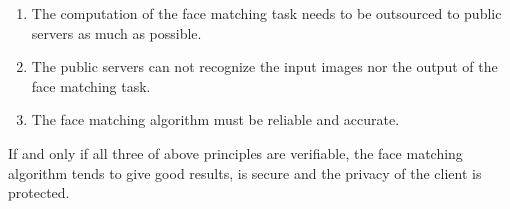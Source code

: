 \begin{enumerate}
\item The computation of the face matching task needs to be outsourced to public servers as much as possible.
\item The public servers can not recognize the input images nor the output of the face matching task.
\item The face matching algorithm must be reliable and accurate.
\end{enumerate}

If and only if all three of above principles are verifiable, the face matching algorithm tends to give good results, is secure and the privacy of the client is protected.
